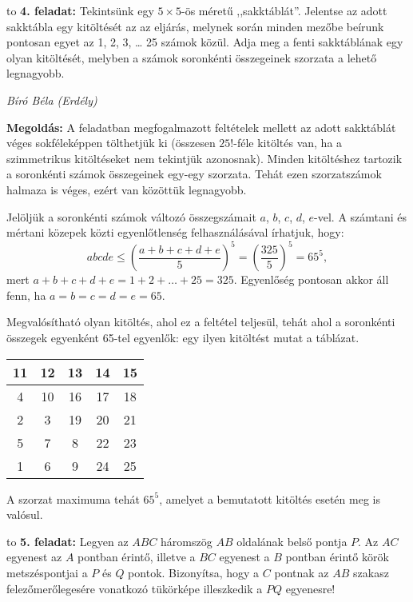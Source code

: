\documentclass[a4paper,10pt]{article}
\newcommand{\ki}[2]{\hfill {\it #1 (#2)}\medskip}
\newcommand{\vonal}{\hbox to \hsize{\hskip2truecm\hrulefill\hskip2truecm}}
\begin{document}
\medskip

\vonal
{\bf 4. feladat: } Tekintsünk egy $5\times5$-ös méretű ,,sakktáblát''. Jelentse az adott sakktábla egy kitöltését az az eljárás, melynek során minden mezőbe beírunk pontosan egyet az 1, 2, 3, \ldots{} 25 számok közül. Adja meg a fenti sakktáblának egy olyan kitöltését, melyben a számok soronkénti összegeinek szorzata a lehető legnagyobb.

\ki{Bíró Béla}{Erdély}\medskip

{\bf Megoldás: } A feladatban megfogalmazott feltételek mellett az adott sakktáblát véges sokféleképpen tölthetjük ki (összesen $25!$-féle kitöltés van, ha a szimmetrikus kitöltéseket nem tekintjük azonosnak). Minden kitöltéshez tartozik a soronkénti számok összegeinek egy-egy szorzata. Tehát ezen szorzatszámok halmaza is véges, ezért van közöttük legnagyobb.

Jelöljük a soronkénti számok változó összegszámait $a$, $b$, $c$, $d$, $e$-vel. A számtani és mértani közepek közti egyenlőtlenség felhasználásával írhatjuk, hogy:
\[abcde\le\left(\frac{a+b+c+d+e}{5}\right)^5=\left(\frac{325}{5}\right)^5=65^5,\]
mert $a+b+c+d+e=1+2+\ldots+25=325$. Egyenlőség pontosan akkor áll fenn, ha $a=b=c=d=e=65$.

Megvalósítható olyan kitöltés, ahol ez a feltétel teljesül, tehát ahol a soronkénti összegek egyenként 65-tel egyenlők: egy ilyen kitöltést mutat a táblázat.

\begin{center}
\begin{tabular}{|c|c|c|c|c|}
\hline
11&12&13&14&15\\
\hline
4&10&16&17&18\\
\hline
2&3&19&20&21\\
\hline
5&7&8&22&23\\
\hline
1&6&9&24&25\\
\hline
\end{tabular}
\end{center}

A szorzat maximuma tehát $65^5$, amelyet a bemutatott kitöltés esetén meg is valósul.

\medskip

\vonal
{\bf 5. feladat: } Legyen az $ABC$ háromszög $AB$ oldalának belső pontja $P$. Az $AC$ egyenest az $A$ pontban érintő, illetve a $BC$ egyenest a $B$ pontban érintő körök metszéspontjai a $P$ és $Q$ pontok. Bizonyítsa, hogy a $C$ pontnak az $AB$ szakasz felezőmerőlegesére vonatkozó tükörképe illeszkedik a $PQ$ egyenesre!
\end{document}
